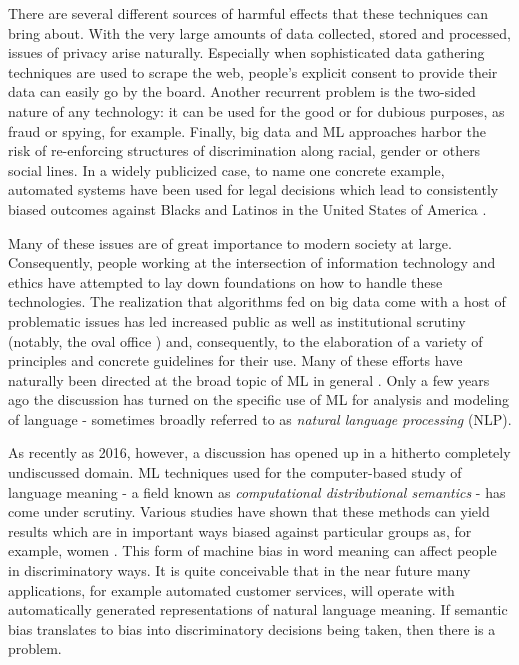 \documentclass{article}
\begin{document}
There are several different sources of harmful effects that these techniques can bring about. With the very large amounts of data collected, stored and processed, issues of privacy arise naturally. Especially when sophisticated data gathering techniques are used to scrape the web, people's explicit consent to provide their data can easily go by the board. Another recurrent problem is the two-sided nature of any technology: it can be used for the good or for dubious purposes, as fraud or spying, for example. Finally, big data and ML approaches harbor the risk of re-enforcing structures of discrimination along racial, gender or others social lines. In a widely publicized case, to name one concrete example, automated systems have been used for legal decisions which lead to consistently biased outcomes against Blacks and Latinos in the United States of America \cite{angwin2016machine}.

Many of these issues are of great importance to modern society at large. Consequently, people working at the intersection of information technology and ethics have attempted to lay down foundations on how to handle these technologies. The realization that algorithms fed on big data come with a host of problematic issues has led increased public as well as institutional scrutiny (notably, the oval office \cite{united2014big}) and, consequently, to the elaboration of a variety of principles and concrete guidelines for their use. Many of these efforts have naturally been directed at the broad topic of ML in general \cite{leidner2017ethical}. Only a few years ago the discussion has turned on the specific use of ML for analysis and modeling of language - sometimes broadly referred to as \emph{natural language processing} (NLP).

As recently as 2016, however, a discussion has opened up in a hitherto completely undiscussed domain. ML techniques used for the computer-based study of language meaning - a field known as \emph{computational distributional semantics} - has come under scrutiny.
Various studies have shown that these methods can  yield results which are in important ways biased against particular groups as, for example, women \cite{bolukbasi2016man} \cite{wagner2015s}.
This form of machine bias in word meaning can affect people in discriminatory ways. It is quite conceivable that in the near future many applications, for example automated customer services, will operate with automatically generated representations of natural language meaning. If semantic bias translates to bias into discriminatory decisions being taken, then there is a problem.
\end{document}
